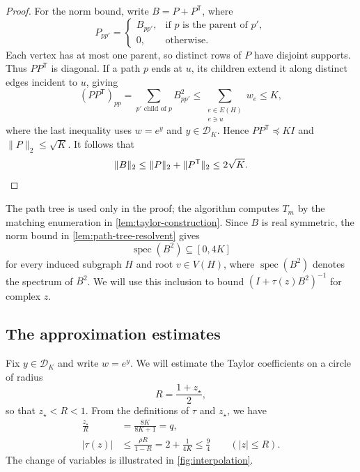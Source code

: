 \documentclass[11pt,reqno,letterpaper]{amsart}
\numberwithin{equation}{section}
\theoremstyle{definition}
\theoremstyle{remark}
\newcommand{\cD}{\mathcal D}
\newcommand{\norm}[1]{\lVert #1\rVert}
\begin{document}
\begin{proof}
For the norm bound, write $B=P+P^{\mathsf T}$, where
\[
 P_{pp'}=
 \begin{cases}
  B_{pp'},&\text{if $p$ is the parent of $p'$},\\
  0,&\text{otherwise}.
 \end{cases}
\]
Each vertex has at most one parent, so distinct rows of $P$
have disjoint supports. Thus $PP^{\mathsf T}$ is diagonal.
If a path $p$ ends at $u$, its children extend it along
distinct edges incident to $u$, giving
\[
 (PP^{\mathsf T})_{pp}
 =\sum_{p'\text{ child of }p}B_{pp'}^2
 \le\sum_{\substack{e\in E(H)\\e\ni u}}w_e
 \le K,
\]
where the last inequality uses $w=e^y$ and $y\in\cD_K$.
Hence $PP^{\mathsf T}\preceq KI$ and $\norm P_2\le\sqrt K$.
It follows that
\[
 \norm B_2
 \le\norm P_2+\norm{P^{\mathsf T}}_2
 \le2\sqrt K.
 \qedhere
\]
\end{proof}


The path tree is used only in the proof; the algorithm computes
$T_m$ by the matching enumeration in
\cref{lem:taylor-construction}. Since $B$ is real symmetric,
the norm bound in \cref{lem:path-tree-resolvent} gives
\[
 \operatorname{spec}(B^2)\subseteq[0,4K]
\]
for every induced subgraph $H$ and root $v\in V(H)$, where
$\operatorname{spec}(B^2)$ denotes the spectrum of $B^2$.
We will use this inclusion to bound $(I+\tau(z)B^2)^{-1}$ for
complex $z$.

\subsection{The approximation estimates}
Fix $y\in\cD_K$ and write $w=e^y$. We will estimate the Taylor
coefficients on a circle of radius
\[
 R=\frac{1+z_\star}{2},
\]
so that $z_\star<R<1$. From the definitions of $\tau$ and $z_\star$,
we have
\begin{equation}\label{eq:interpolation-contour-bounds}
 \begin{aligned}
  \frac{z_\star}{R}&=\frac{8K}{8K+1}=q,\\
  |\tau(z)|&\le\frac{\rho R}{1-R}
             =2+\frac1{4K}\le\frac94
             \qquad(|z|\le R).
 \end{aligned}
\end{equation}
The change of variables is illustrated in \cref{fig:interpolation}.
\end{document}
